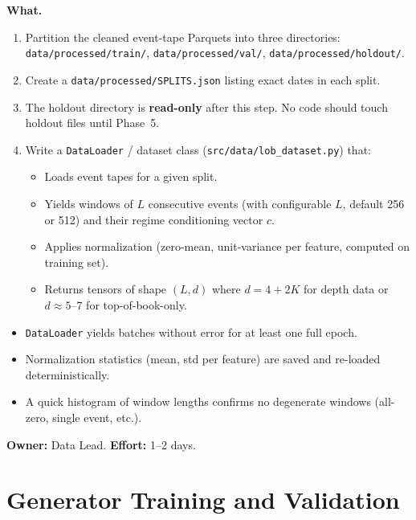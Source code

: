 \documentclass[11pt,a4paper]{article}
\begin{document}
\textbf{What.}
\begin{enumerate}[nosep]
  \item Partition the cleaned event-tape Parquets into three directories: \texttt{data/processed/train/}, \texttt{data/processed/val/}, \texttt{data/processed/holdout/}.
  \item Create a \texttt{data/processed/SPLITS.json} listing exact dates in each split.
  \item The holdout directory is \textbf{read-only} after this step.  No code should touch holdout files until Phase~5.
  \item Write a \texttt{DataLoader} / dataset class (\texttt{src/data/lob\_dataset.py}) that:
    \begin{itemize}[nosep]
      \item Loads event tapes for a given split.
      \item Yields windows of $L$ consecutive events (with configurable $L$, default 256 or 512) and their regime conditioning vector $c$.
      \item Applies normalization (zero-mean, unit-variance per feature, computed on training set).
      \item Returns tensors of shape $(L, d)$ where $d = 4 + 2K$ for depth data or $d \approx 5$--7 for top-of-book-only.
    \end{itemize}
\end{enumerate}

\begin{successbox}
  \begin{itemize}[nosep]
    \item \texttt{DataLoader} yields batches without error for at least one full epoch.
    \item Normalization statistics (mean, std per feature) are saved and re-loaded deterministically.
    \item A quick histogram of window lengths confirms no degenerate windows (all-zero, single event, etc.).
  \end{itemize}
\end{successbox}

\textbf{Owner:} Data Lead. \quad \textbf{Effort:} 1--2 days.


\section{Generator Training and Validation}
\end{document}
